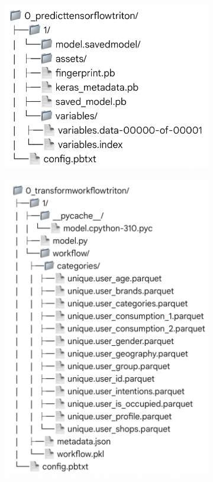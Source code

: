 \begin{figure}[H]
    \centering
    \begin{subfigure}{.31\textwidth}
        \centering
        \includegraphics[width=\textwidth]{assets/ensemble_0.png}
        \label{fig:Ensemble0}
    \end{subfigure}
    \begin{subfigure}{.25\textwidth}
        \centering
        \includegraphics[width=\textwidth]{assets/ensemble_1.png}

\end{subfigure}
\end{figure}
